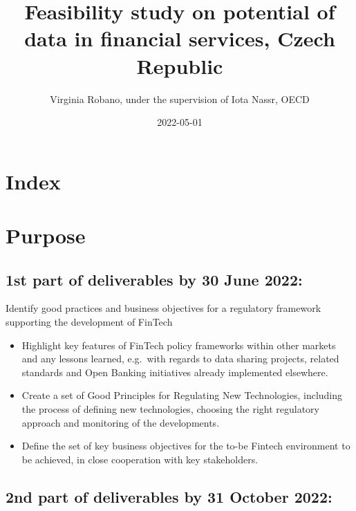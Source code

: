 \documentclass[
]{book}
\title{Feasibility study on potential of data in financial services, Czech Republic}
\author{Virginia Robano, under the supervision of Iota Nassr, OECD}
\date{2022-05-01}
\begin{document}
\maketitle

{
\setcounter{tocdepth}{1}
\tableofcontents
}
\hypertarget{index}{%
\chapter*{Index}\label{index}}

\hypertarget{purpose}{%
\chapter{Purpose}\label{purpose}}

\hypertarget{st-part-of-deliverables-by-30-june-2022}{%
\section*{1st part of deliverables by 30 June 2022:}\label{st-part-of-deliverables-by-30-june-2022}}

Identify good practices and business objectives for a regulatory framework supporting the development of FinTech

\begin{itemize}
\item
  Highlight key features of FinTech policy frameworks within other markets and any lessons learned, e.g.~with regards to data sharing projects, related standards and Open Banking initiatives already implemented elsewhere.
\item
  Create a set of Good Principles for Regulating New Technologies, including the process of defining new technologies, choosing the right regulatory approach and monitoring of the developments.
\item
  Define the set of key business objectives for the to-be Fintech environment to be achieved, in close cooperation with key stakeholders.
\end{itemize}

\hypertarget{nd-part-of-deliverables-by-31-october-2022}{%
\section*{2nd part of deliverables by 31 October 2022:}\label{nd-part-of-deliverables-by-31-october-2022}}
\end{document}
